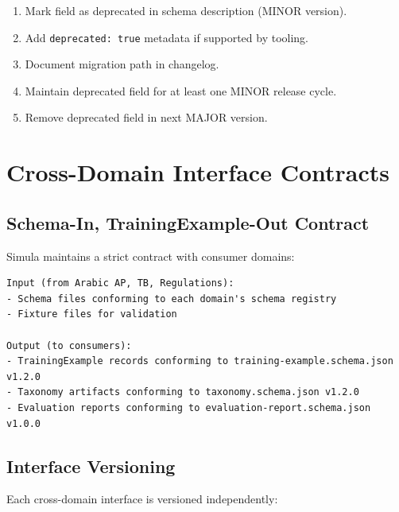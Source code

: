 \documentclass[12pt,a4paper,twoside]{report}
\begin{document}
\begin{enumerate}
\item Mark field as deprecated in schema description (MINOR version).
\item Add \texttt{deprecated: true} metadata if supported by tooling.
\item Document migration path in changelog.
\item Maintain deprecated field for at least one MINOR release cycle.
\item Remove deprecated field in next MAJOR version.
\end{enumerate}

\section{Cross-Domain Interface Contracts}

\subsection{Schema-In, TrainingExample-Out Contract}

Simula maintains a strict contract with consumer domains:

\begin{lstlisting}[basicstyle=\ttfamily\small,caption={Cross-domain interface contract.}]
Input (from Arabic AP, TB, Regulations):
- Schema files conforming to each domain's schema registry
- Fixture files for validation

Output (to consumers):
- TrainingExample records conforming to training-example.schema.json v1.2.0
- Taxonomy artifacts conforming to taxonomy.schema.json v1.2.0
- Evaluation reports conforming to evaluation-report.schema.json v1.0.0
\end{lstlisting}

\subsection{Interface Versioning}

Each cross-domain interface is versioned independently:
\end{document}
